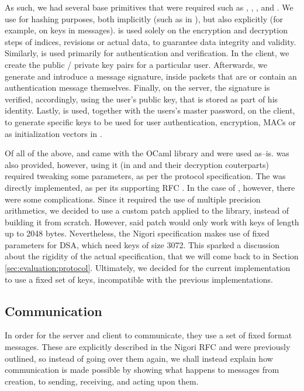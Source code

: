 As such, we had several base primitives that were required such as , , ,  and .
We use  for hashing purposes, both implicitly (such as in ), but also explicitly (for example, on  keys in messages).
 is used solely on the encryption and decryption steps of indices, revisions or actual data, to guarantee data integrity and validity.
Similarly,  is used primarily for authentication and verification.
In the client, we create the public / private key pairs for a particular user.
Afterwards, we generate and introduce a message signature, inside packets that are or contain an authentication message themselves.
Finally, on the server, the signature is verified, accordingly, using the user's public key, that is stored as part of his identity.
Lastly,  is used, together with the users's master password, on the client, to generate specific keys to be used for user authentication, encryption, MACs or as initialization vectors in .

Of all of the above,  and  came with the OCaml  library and were used as--is.
 was also provided, however, using it (in  and  and their decryption couterparts) required tweaking some parameters, as per the protocol specification.
The  was directly implemented, as per its supporting RFC \cite{RFC2898}.
In the case of , however, there were some complications.
Since it required the use of multiple precision arithmetics, we decided to use a custom patch applied to the  library, instead of building it from scratch.
However, said patch would only work with keys of length up to 2048 bytes.
Nevertheless, the Nigori specification makes use of fixed parameters for DSA, which need keys of size 3072.
This sparked a discussion about the rigidity of the actual specification, that we will come back to in Section \ref{sec:evaluation:protocol}.
Ultimately, we decided for the current implementation to use a fixed set of keys, incompatible with the previous implementations.

\subsection{Communication}
In order for the server and client to communicate, they use a set of fixed format messages.
These are explicitly described in the Nigori RFC and were previously outlined, so instead of going over them again, we shall instead explain how communication is made possible by showing what happens to messages from creation, to sending, receiving, and acting upon them.

